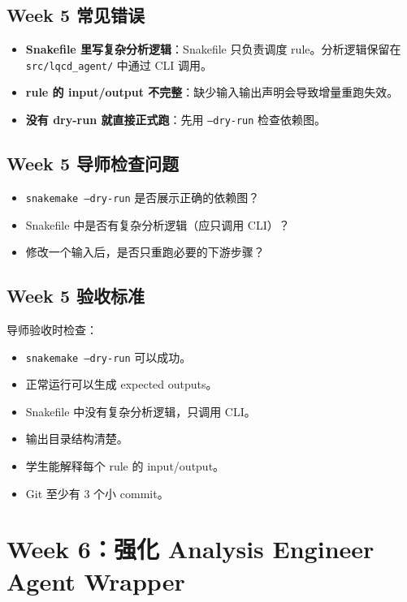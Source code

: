 \documentclass[11pt,a4paper,fontset=none]{ctexart}
\begin{document}
\subsection{Week 5 常见错误}
\begin{itemize}[leftmargin=2em]
  \item \textbf{Snakefile 里写复杂分析逻辑}：Snakefile 只负责调度 rule。分析逻辑保留在 \texttt{src/lqcd\_agent/} 中通过 CLI 调用。
  \item \textbf{rule 的 input/output 不完整}：缺少输入输出声明会导致增量重跑失效。
  \item \textbf{没有 dry-run 就直接正式跑}：先用 \texttt{--dry-run} 检查依赖图。
\end{itemize}

\subsection{Week 5 导师检查问题}
\begin{itemize}[leftmargin=2em]
  \item \texttt{snakemake --dry-run} 是否展示正确的依赖图？
  \item Snakefile 中是否有复杂分析逻辑（应只调用 CLI）？
  \item 修改一个输入后，是否只重跑必要的下游步骤？
\end{itemize}

\subsection{Week 5 验收标准}

导师验收时检查：

\begin{itemize}[leftmargin=2em]
  \item \texttt{snakemake --dry-run} 可以成功。
  \item 正常运行可以生成 expected outputs。
  \item Snakefile 中没有复杂分析逻辑，只调用 CLI。
  \item 输出目录结构清楚。
  \item 学生能解释每个 rule 的 input/output。
  \item Git 至少有 3 个小 commit。
\end{itemize}

\newpage

\section{Week 6：强化 Analysis Engineer Agent Wrapper}
\end{document}
